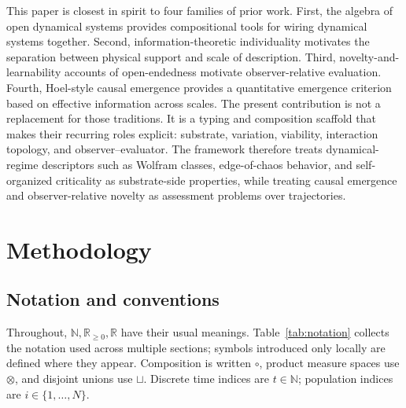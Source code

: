\documentclass[journal]{IEEEtran}
\theoremstyle{plain}
\theoremstyle{definition}
\theoremstyle{plain}
\newcommand{\R}{\mathbb{R}}
\newcommand{\N}{\mathbb{N}}
\begin{document}
This paper is closest in spirit to four families of prior work. First, the
algebra of open dynamical systems \cite{vagner2015algebras,schultz2020sheaves}
provides compositional tools for wiring dynamical systems together. Second,
information-theoretic individuality \cite{krakauer2020individuality} motivates
the separation between physical support and scale of description. Third,
novelty-and-learnability accounts of open-endedness
\cite{hughes2024openendedness} motivate observer-relative evaluation. Fourth,
Hoel-style causal emergence provides a quantitative emergence criterion based on
effective information across scales. The present contribution is not a
replacement for those traditions. It is a typing and composition scaffold that
makes their recurring roles explicit: substrate, variation, viability,
interaction topology, and observer--evaluator. The framework therefore treats
dynamical-regime descriptors such as Wolfram classes, edge-of-chaos behavior,
and self-organized criticality as substrate-side properties, while treating
causal emergence and observer-relative novelty as assessment problems over
trajectories.

\section{Methodology}\label{sec:methodology}

\subsection{Notation and conventions}

Throughout, $\N, \R_{\geq 0}, \R$ have their usual meanings. Table~\ref{tab:notation}
collects the notation used across multiple sections; symbols introduced only
locally are defined where they appear. Composition is written $\circ$, product
measure spaces use $\otimes$, and disjoint unions use $\sqcup$. Discrete time
indices are $t \in \N$; population indices are $i \in \{1,\dots,N\}$.
\end{document}
